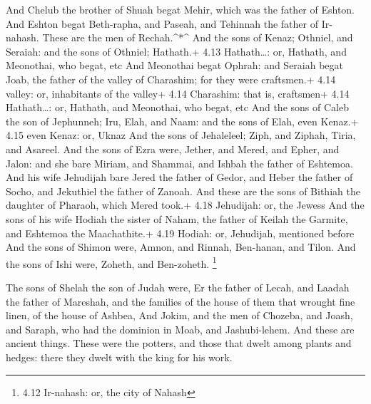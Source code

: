  And Chelub the brother of Shuah begat Mehir, which was the
father of Eshton.  And Eshton begat Beth-rapha, and Paseah,
and Tehinnah the father of Ir-nahash. These are the men of
Rechah.\^{}*\^{}  And the sons of Kenaz; Othniel, and
Seraiah: and the sons of Othniel; Hathath.+ 4.13 Hathath\ldots: or,
Hathath, and Meonothai, who begat, etc  And Meonothai begat
Ophrah: and Seraiah begat Joab, the father of the valley of Charashim;
for they were craftsmen.+ 4.14 valley: or, inhabitants of the valley+
4.14 Charashim: that is, craftsmen+ 4.14 Hathath\ldots: or, Hathath, and
Meonothai, who begat, etc  And the sons of Caleb the son of
Jephunneh; Iru, Elah, and Naam: and the sons of Elah, even Kenaz.+ 4.15
even Kenaz: or, Uknaz  And the sons of Jehaleleel; Ziph,
and Ziphah, Tiria, and Asareel.  And the sons of Ezra were,
Jether, and Mered, and Epher, and Jalon: and she bare Miriam, and
Shammai, and Ishbah the father of Eshtemoa.  And his wife
Jehudijah bare Jered the father of Gedor, and Heber the father of Socho,
and Jekuthiel the father of Zanoah. And these are the sons of Bithiah
the daughter of Pharaoh, which Mered took.+ 4.18 Jehudijah: or, the
Jewess  And the sons of his wife Hodiah the sister of
Naham, the father of Keilah the Garmite, and Eshtemoa the Maachathite.+
4.19 Hodiah: or, Jehudijah, mentioned before  And the sons
of Shimon were, Amnon, and Rinnah, Ben-hanan, and Tilon. And the sons of
Ishi were, Zoheth, and Ben-zoheth. \footnote{4.12 Ir-nahash: or, the
  city of Nahash}

 The sons of Shelah the son of Judah were, Er the father of
Lecah, and Laadah the father of Mareshah, and the families of the house
of them that wrought fine linen, of the house of Ashbea, 
And Jokim, and the men of Chozeba, and Joash, and Saraph, who had the
dominion in Moab, and Jashubi-lehem. And these are ancient things.
 These were the potters, and those that dwelt among plants
and hedges: there they dwelt with the king for his work.

